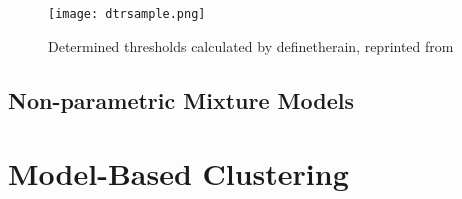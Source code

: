 \begin{figure}[h]
    \centering
    \texttt{[image: dtrsample.png]}
    \caption[Determined thresholds calculated by definetherain]{Determined thresholds calculated by definetherain, reprinted from \cite{jonesThreshold}}
        \label{fig:dtrsample}
\end{figure}



\subsection{Non-parametric Mixture Models}
\label{sec:nonparametricmixmodels}

\section{Model-Based Clustering}
\label{sec:modelbasedclustering}

